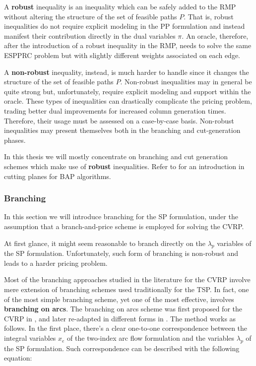 A \textbf{robust} inequality is an inequality which can be safely added to the RMP without altering the structure of the set of feasible paths $P$.
That is, robust inequalities do not require explicit modeling in the PP formulation and instead manifest their contribution directly in the dual variables $\pi$.
An oracle, therefore, after the introduction of a robust inequality in the RMP, needs to solve the same ESPPRC problem but with slightly different weights associated on each edge.

A \textbf{non-robust} inequality, instead, is much harder to handle since it changes the structure of the set of feasible paths $P$.
Non-robust inequalities may in general be quite strong but, unfortunately, require explicit modeling and support within the oracle.
These types of inequalities can drastically complicate the pricing problem, trading better dual improvements for increased column generation times.
Therefore, their usage must be assessed on a case-by-case basis.
Non-robust inequalities may present themselves both in the branching and cut-generation phases.

In this thesis we will mostly concentrate on branching and cut generation schemes which make use of \textbf{robust} inequalities.
Refer to \textcite{desaulniers2011} for an introduction in cutting planes for BAP algorithms.


\begin{comment}
When a violated inequality in the two/three-index formulation is found, it is decomposed at runtime and introduced in the master problem.
\end{comment}


\subsubsection{Branching}
\label{sec:bap-branching}

In this section we will introduce branching for the SP formulation,
under the assumption that a branch-and-price scheme is employed
for solving the CVRP.

At first glance,
it might seem reasonable to branch directly on the $\lambda_p$ variables of the SP formulation.
Unfortunately, such form of branching is non-robust
and leads to a harder pricing problem.

Most of the branching approaches studied in the literature for the CVRP involve
mere extension of branching schemes used traditionally for the TSP.
In fact, one of the most simple branching scheme,
yet one of the most effective,
involves \textbf{branching on arcs}.
The branching on arcs scheme was first proposed for the CVRP in \textcite{christofides1969a},
and later re-adapted in different forms in \textcite{fisher1994a, miller1995}.
The method works as follows.
In the first place, there's a clear one-to-one correspondence between the integral variables $x_e$ of the
two-index arc flow formulation and the variables $\lambda_p$ of the SP formulation.
Such correspondence can be described with the following equation:

